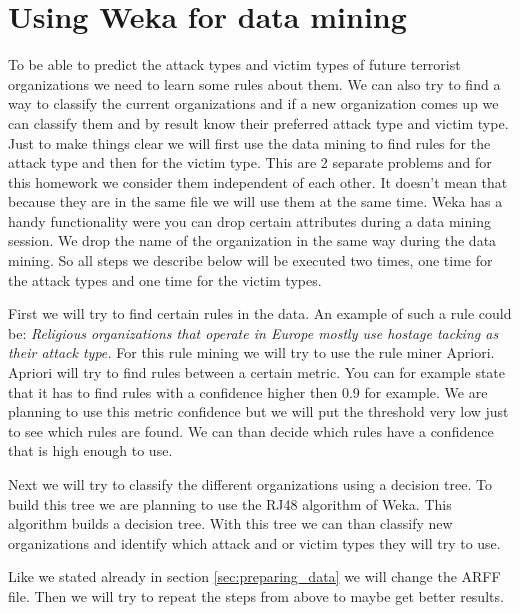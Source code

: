 \documentclass[a4]{article}
\begin{document}
\section{Using Weka for data mining}
\label{sec:weka}
To be able to predict the attack types and victim types of future terrorist organizations we need to learn some rules about them. We can also try to find a way to classify the current organizations and if a new organization comes up we can classify them and by result know their preferred attack type and victim type. Just to make things clear we will first use the data mining to find rules for the attack type and then for the victim type. This are 2 separate problems and for this homework we consider them independent of each other. It doesn't mean that because they are in the same file we will use them at the same time. Weka has a handy functionality were you can drop certain attributes during a data mining session. We drop the name of the organization in the same way during the data mining. So all steps we describe below will be executed two times, one time for the attack types and one time for the victim types.\par
First we will try to find certain rules in the data. An example of such a rule could be: \textit{Religious organizations that operate in Europe mostly use hostage tacking as their attack type.} For this rule mining we will try to use the rule miner Apriori. Apriori will try to find rules between a certain metric. You can for example state that it has to find rules with a confidence higher then 0.9 for example. We are planning to use this metric confidence but we will put the threshold very low just to see which rules are found. We can than decide which rules have a confidence that is high enough to use.\par
Next we will try to classify the different organizations using a decision tree. To build this tree we are planning to use the RJ48 algorithm of Weka. This algorithm builds a decision tree. With this tree we can than classify new organizations and identify which attack and or victim types they will try to use.\par
Like we stated already in section \ref{sec:preparing_data} we will change the ARFF file. Then we will try to repeat the steps from above to maybe get better results.
\end{document}
